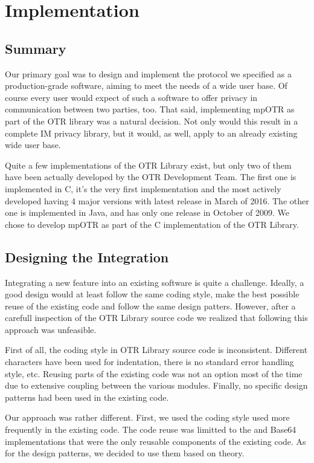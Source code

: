 \chapter{Implementation}
\label{chapter:implementation}


\section{Summary}
Our primary goal was to design and implement the protocol we specified as a production-grade software, aiming to meet the needs of a wide user base. Of course every user would expect of such a software to offer privacy in communication between two parties, too. That said, implementing mpOTR as part of the OTR library was a natural decision. Not only would this result in a complete IM privacy library, but it would, as well, apply to an already existing wide user base.

Quite a few implementations of the OTR Library exist, but only two of them have been actually developed by the OTR Development Team. The first one is implemented in C, it's the very first implementation and the most actively developed having 4 major versions with latest release in March of 2016. The other one is implemented in Java, and has only one release in October of 2009. We chose to develop mpOTR as part of the C implementation of the OTR Library.


\section{Designing the Integration}
Integrating a new feature into an existing software is quite a challenge. Ideally, a good design would at least follow the same coding style, make the best possible reuse of the existing code and follow the same design patters. However, after a carefull inspection of the OTR Library source code we realized that following this approach was unfeasible.

First of all, the coding style in OTR Library source code is inconsistent. Different characters have been used for indentation, there is no standard error handling style, etc. Reusing parts of the existing code was not an option most of the time due to extensive coupling between the various modules. Finally, no specific design patterns had been used in the existing code.

Our approach was rather different. First, we used the coding style used more frequently in the existing code. The code reuse was limitted to the \dhname and Base64 implementations that were the only reusable components of the existing code. As for the design patterns, we decided to use them based on theory.


